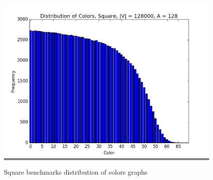 \documentclass{article}
\begin{document}
\begin{figure}
\begin{minipage}{0.3\textwidth}
    \colorbox{gray}{\includegraphics[width=\linewidth]{./graphs/hist_colors_square_6.png}}
    \end{minipage}
    \hspace{\fill}

    \caption{Square benchmarks distribution of colors graphs}
    \label{squarecolorhists}
\end{figure}
\end{document}
